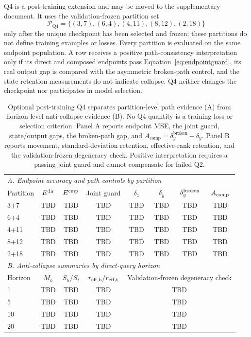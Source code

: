 \documentclass[letterpaper]{article} %
\begin{document}
Q4 is a post-training extension and may be moved to the supplementary
document. It uses the validation-frozen partition set
\[
\mathcal P_{\mathrm{Q4}}=\{(3,7),(6,4),(4,11),(8,12),(2,18)\}
\]
only after the
unique checkpoint has been selected and frozen; these partitions do not define
training examples or losses. Every partition is evaluated on the same endpoint
population. A row receives a positive path-consistency interpretation only if
its direct and composed endpoints pass Equation~\ref{eq:endpointguard}, its
real output gap is compared with the asymmetric broken-path control, and the
state-retention measurements do not indicate collapse. Q4 neither changes the
checkpoint nor participates in model selection.

\begin{table}[!t]
\centering
\small
\setlength{\tabcolsep}{2.1pt}
\begin{tabular}{lccccccc}
\toprule
\multicolumn{8}{l}{\emph{A. Endpoint accuracy and path controls by partition}}\\
Partition & $E^{\rm dir}$ & $E^{\rm cmp}$ & Joint guard &
$\delta_z$ & $\delta_y$ & $\delta_y^{\rm broken}$ & $A_{\rm comp}$\\
\midrule
3+7 & TBD & TBD & TBD & TBD & TBD & TBD & TBD\\
6+4 & TBD & TBD & TBD & TBD & TBD & TBD & TBD\\
4+11 & TBD & TBD & TBD & TBD & TBD & TBD & TBD\\
8+12 & TBD & TBD & TBD & TBD & TBD & TBD & TBD\\
2+18 & TBD & TBD & TBD & TBD & TBD & TBD & TBD\\
\midrule
\multicolumn{8}{l}{\emph{B. Anti-collapse summaries by direct-query horizon}}\\
Horizon & $M_h$ & $S_h/S_t$ & $r_{\rm eff,h}/r_{\rm eff,t}$ &
\multicolumn{4}{c}{Validation-frozen degeneracy check}\\
\midrule
1 & TBD & TBD & TBD & \multicolumn{4}{c}{TBD}\\
5 & TBD & TBD & TBD & \multicolumn{4}{c}{TBD}\\
10 & TBD & TBD & TBD & \multicolumn{4}{c}{TBD}\\
20 & TBD & TBD & TBD & \multicolumn{4}{c}{TBD}\\
\bottomrule
\end{tabular}
\caption{Optional post-training Q4 separates partition-level path evidence
(A) from horizon-level anti-collapse evidence (B). No Q4 quantity is a
training loss or selection criterion. Panel A reports endpoint MSE, the joint
guard, state/output gaps, the broken-path gap, and
$A_{\mathrm{comp}}=\delta_y^{\mathrm{broken}}-\delta_y$. Panel B reports
movement, standard-deviation retention, effective-rank retention, and the
validation-frozen degeneracy check. Positive interpretation requires a passing
joint guard and cannot compensate for failed Q2.}
\label{tab:composition}
\end{table}
\end{document}
